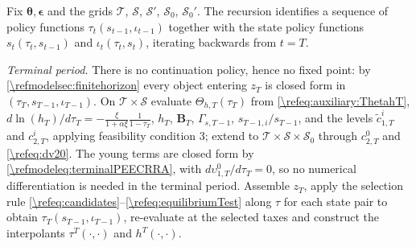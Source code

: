 \begin{alg}
\label{\refalg:CRRA:grid}
Fix $\bm{\theta},\bm{\epsilon}$ and the grids $\mathcal{T}$, $\mathcal{S}$, $\mathcal{S}'$, $\mathcal{S}_0$, $\mathcal{S}_0'$. The recursion identifies a sequence of policy functions $\tau_t(s_{t-1},\iota_{t-1})$ together with the state policy functions $s_t(\tau_t,s_{t-1})$ and $\iota_t(\tau_t,s_t)$, iterating backwards from $t=T$.

\smallskip\noindent\emph{Terminal period.} There is no continuation policy, hence no fixed point: by \cref{\refmodelsec:finitehorizon} every object entering $z_T$ is closed form in $(\tau_T, s_{T-1}, \iota_{T-1})$. On $\mathcal{T}\times\mathcal{S}$ evaluate $\Theta_{h,T}(\tau_T)$ from \eqref{\refeq:auxiliary:ThetahT}, $d\ln(h_T)/d\tau_T = -\frac{\xi}{1+\alpha\xi}\frac{1}{1-\tau_T}$, $h_T$, $\bm{B}_T$, $\Gamma_{s,T-1}$, $s_{T-1,i}/s_{T-1}$, and the levels $\tilde{c}_{1,T}^i$ and $c_{2,T}^i$, applying feasibility condition 3; extend to $\mathcal{T}\times\mathcal{S}\times\mathcal{S}_0$ through $c_{2,T}^0$ and \eqref{\refeq:dv20}. The young terms are closed form by \eqref{\refmodeleq:terminalPEECRRA}, with $d\upsilon_{1,T}^0/d\tau_T = 0$, so no numerical differentiation is needed in the terminal period. Assemble $z_T$, apply the selection rule \eqref{\refeq:candidates}--\eqref{\refeq:equilibriumTest} along $\tau$ for each state pair to obtain $\tau_T(s_{T-1},\iota_{T-1})$, re-evaluate at the selected taxes and construct the interpolants $\tau^T(\cdot,\cdot)$ and $h^T(\cdot,\cdot)$.


\end{alg}
